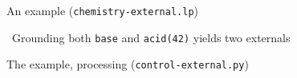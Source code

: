 \begin{frame}[fragile]{An example (\texttt{chemistry-external.lp})}
  \bigskip
  
  \pause\smallskip
  
  \pause\medskip
   \ Grounding both \texttt{base} and \texttt{acid(42)} yields two externals
\end{frame}
\begin{frame}[fragile]{The example, processing (\texttt{control-external.py})}
    \bigskip
    
    \pause\medskip
    
\end{frame}
%
